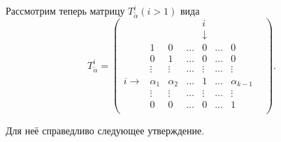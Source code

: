 Рассмотрим теперь матрицу $T^{i}_{\tilde\alpha}(i>1)$ вида
$$
T^{i}_{\tilde\alpha}=\begin{pmatrix}
 &&         &          &       i           &                &\\
          &&         &          &       \downarrow           &&                \\
    &1     &        0&    \ldots&       0&     \ldots&               0&\\
    &0     &        1&    \ldots&       0&     \ldots&               0&\\
    &\vdots&   \vdots&    \ldots&  \vdots&     \ldots&          \vdots&\\
  i\rightarrow&\alpha_1& \alpha_2&    \ldots&       1&     \ldots&    \alpha_{k-1}&\\
    &\vdots&   \vdots&    \ldots&  \vdots&     \ldots&          \vdots&\\
     &    0&        0&    \ldots&       0&     \ldots&               1&\\
     &&&&&&
\end{pmatrix}.
$$

Для неё справедливо следующее утверждение.

